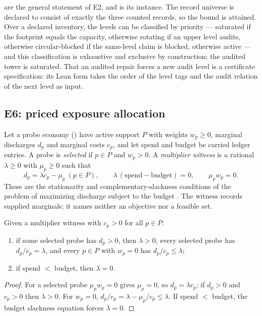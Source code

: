  are the general statement of E2, and  is its
instance. The record universe is declared to consist of exactly the three counted records, so the
bound is attained. Over a declared inventory, the levels can be classified by priority --- saturated
if the footprint equals the capacity, otherwise rotating if an upper level audits, otherwise
circular-blocked if the same-level claim is blocked, otherwise active --- and this classification is
exhaustive and exclusive by construction; the audited tower is saturated. That an audited repair
forces a new audit level is a certificate specification: its Lean form takes the order of the level
tags and the audit relation of the next level as input.

\subsection{E6: priced exposure allocation}\label{sec:allocation}

Let a probe economy () have active support $P$ with weights $w_p \ge 0$, marginal
discharges $d_p$ and marginal costs $c_p$, and let spend and budget be carried ledger entries. A
probe is \emph{selected} if $p \in P$ and $w_p > 0$. A \emph{multiplier witness} is a rational
$\lambda \ge 0$ with $\mu_p \ge 0$ such that
\begin{equation}\label{eq:kkt}
  d_p = \lambda c_p - \mu_p \ (p \in P), \qquad
  \lambda\,(\text{spend} - \text{budget}) = 0, \qquad
  \mu_p w_p = 0 .
\end{equation}
These are the stationarity and complementary-slackness conditions of the problem of maximizing
discharge subject to the budget \citep{BoydVandenberghe2004}. The witness records supplied
marginals; it names neither an objective nor a feasible set.

\begin{theorem}\label{thm:e6-kkt}
Given a multiplier witness with $c_p > 0$ for all $p \in P$:
\begin{enumerate}
  \item if some selected probe has $d_p > 0$, then $\lambda > 0$, every selected probe has
    $d_p / c_p = \lambda$, and every $p \in P$ with $w_p = 0$ has $d_p / c_p \le \lambda$;
  \item if spend $<$ budget, then $\lambda = 0$.
\end{enumerate}
\end{theorem}

\begin{proof}
For a selected probe $\mu_p w_p = 0$ gives $\mu_p = 0$, so $d_p = \lambda c_p$; if $d_p > 0$ and
$c_p > 0$ then $\lambda > 0$. For $w_p = 0$, $d_p/c_p = \lambda - \mu_p/c_p \le \lambda$. If spend
$<$ budget, the budget slackness equation forces $\lambda = 0$.
\end{proof}

